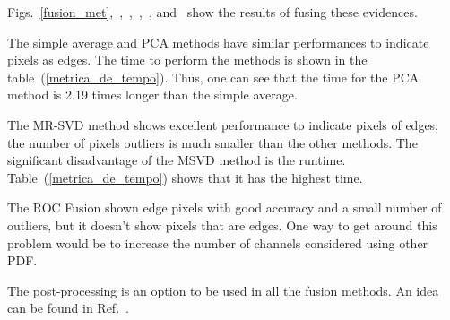 \documentclass[journal]{IEEEtran}
\begin{document}
Figs.~\ref{fusion_met},~,~,~,~, and~ show the results of fusing these evidences. 

The simple average and PCA methods have similar performances to indicate pixels as edges. The time to perform the methods is shown in the table~(\ref{metrica_de_tempo}). Thus, one can see that the time for the PCA method is 2.19 times longer than the simple average.  

The MR-SVD method shows excellent performance to indicate pixels of edges; the number of pixels outliers is much smaller than the other methods. The significant disadvantage of the MSVD method is the runtime. Table~(\ref{metrica_de_tempo}) shows that it has the highest time.

The ROC Fusion shown edge pixels with good accuracy and a small number of outliers, but it doesn't show pixels that are edges. One way to get around this problem would be to increase the number of channels considered using other PDF.

The post-processing is an option to be used in all the fusion methods. An idea can be found in Ref.~\cite{fbgm}. 
\end{document}
